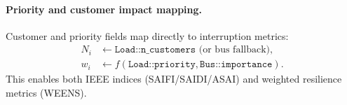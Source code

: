 \paragraph{Priority and customer impact mapping.}
Customer and priority fields map directly to interruption metrics:
\begin{align}
N_i &\leftarrow \texttt{Load::n\_customers} \text{ (or bus fallback)}, \\
w_i &\leftarrow f(\texttt{Load::priority}, \texttt{Bus::importance}).
\end{align}
This enables both IEEE indices (SAIFI/SAIDI/ASAI) and weighted resilience
metrics (WEENS).
